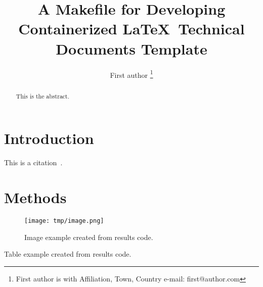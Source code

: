 \documentclass{article}
\begin{document}

\title{A Makefile for Developing Containerized \LaTeX\ Technical Documents Template}

\author{First author
\thanks{First author is with Affiliation, Town, Country e-mail: first@author.com}}

\maketitle

\begin{abstract}
	This is the abstract.
\end{abstract}

\section{Introduction}
This is a citation~\cite{author2000title}.

\section{Methods}

\begin{figure}
	\texttt{[image: tmp/image.png]}
	\caption{Image example created from results code.}
	\label{fig:image}
\end{figure}

\begin{table}
	\centering
	\caption{Table example created from results code.}
	\label{table:table}
	\setlength\tabcolsep{4.2pt}
	
\end{table}



\end{document}
